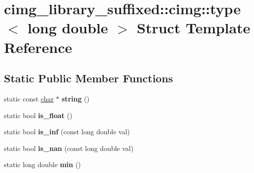 \hypertarget{structcimg__library__suffixed_1_1cimg_1_1type_3_01long_01double_01_4}{}\section{cimg\+\_\+library\+\_\+suffixed\+:\+:cimg\+:\+:type$<$ long double $>$ Struct Template Reference}
\label{structcimg__library__suffixed_1_1cimg_1_1type_3_01long_01double_01_4}
\subsection*{Static Public Member Functions}
\begin{DoxyCompactItemize}
\item 
\mbox{\label{structcimg__library__suffixed_1_1cimg_1_1type_3_01long_01double_01_4_a602ee99d33754c952610e4392012073b}} 
static const \hyperlink{classchar}{char} $\ast$ {\bfseries string} ()
\item 
\mbox{\label{structcimg__library__suffixed_1_1cimg_1_1type_3_01long_01double_01_4_ade027101ec306f55c60a6775c8e1a3f5}} 
static bool {\bfseries is\+\_\+float} ()
\item 
\mbox{\label{structcimg__library__suffixed_1_1cimg_1_1type_3_01long_01double_01_4_a9681404bc847cae1a4742a74b4e307a3}} 
static bool {\bfseries is\+\_\+inf} (const long double val)
\item 
\mbox{\label{structcimg__library__suffixed_1_1cimg_1_1type_3_01long_01double_01_4_aac79390f74e70206204725ebe071b025}} 
static bool {\bfseries is\+\_\+nan} (const long double val)
\item 
\mbox{\label{structcimg__library__suffixed_1_1cimg_1_1type_3_01long_01double_01_4_a47a390fab2c2feaaba0918c7bdc56199}} 
static long double {\bfseries min} ()
\item 
\mbox{\label{structcimg__library__suffixed_1_1cimg_1_1type_3_01long_01double_01_4_a89e7ae5207b82584d340a5c578364ae9}} 

\end{DoxyCompactItemize}
